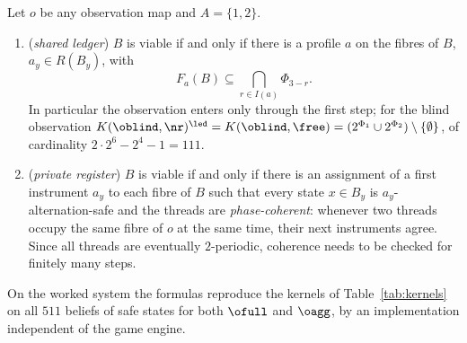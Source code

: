 \begin{theorem}\label{thm:closed}
Let $o$ be any observation map and $A=\{1,2\}$.
\begin{enumerate}[label=(\alph*),leftmargin=2em,itemsep=1pt]
\item (\emph{shared ledger}) $B$ is viable if and only if there is a profile $a$ on the fibres of $B$, $a_y\in R(B_y)$, with
\[
F_a(B)\subseteq\bigcap_{r\in I(a)}\Phi_{3-r}.
\]
In particular the observation enters only through the first step; for the blind observation $K(\oblind,\nr)^{\led}=K(\oblind,\free)=(2^{\Phi_1}\cup 2^{\Phi_2})\setminus\{\emptyset\}$, of cardinality $2\cdot 2^{6}-2^{4}-1=111$.
\item (\emph{private register}) $B$ is viable if and only if there is an assignment of a first instrument $a_y$ to each fibre of $B$ such that every state $x\in B_y$ is $a_y$-alternation-safe and the threads are \emph{phase-coherent}: whenever two threads occupy the same fibre of $o$ at the same time, their next instruments agree. Since all threads are eventually $2$-periodic, coherence needs to be checked for finitely many steps.
\end{enumerate}
On the worked system the formulas reproduce the kernels of Table~\ref{tab:kernels} on all $511$ beliefs of safe states for both $\ofull$ and $\oagg$, by an implementation independent of the game engine.
\end{theorem}


